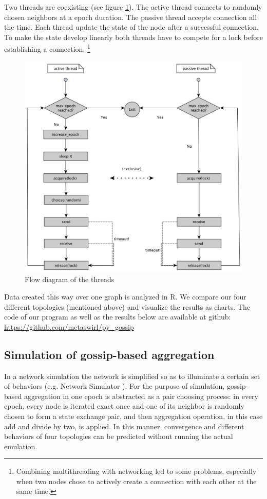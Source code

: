 Two threads are coexisting (see figure \ref{fig:flow_diag}). The active thread connects to randomly chosen neighbors at a epoch duration. The passive thread accepts connection all the time. Each thread update the state of the node after a successful connection. To make the state develop linearly both threads have to compete for a lock before establishing a connection. \footnote{Combining multithreading with networking led to some problems, especially when two nodes chose to actively create a connection with each other at the same time.}
\begin{figure}[h!]
    \begin{center}
        \includegraphics[scale=0.25]{flow_diag.jpg}
    \end{center}
    \caption{Flow diagram of the threads}
    \label{fig:flow_diag}
\end{figure}

Data created this way over one graph is analyzed in R. We compare our four different topologies (mentioned above) and visualize the results as charts. The code of our program as well as the results below are available at github: \url{https://github.com/metaswirl/py_gossip}

\subsection{Simulation of gossip-based aggregation}
In a network simulation the network is simplified so as to illuminate a certain set of behaviors (e.g. Network Simulator \cite{ns}). For the purpose of simulation, gossip-based aggregation in one epoch is abstracted as a pair choosing process: in every epoch, every node is iterated exact once and one of its neighbor is randomly chosen to form a state exchange pair, and then aggregation operation, in this case add and divide by two, is applied. In this manner, convergence and different behaviors of four topologies can be predicted without running the actual emulation.
